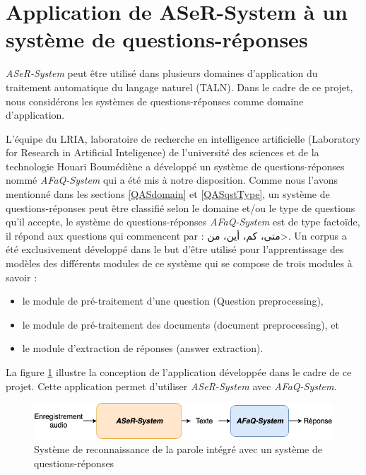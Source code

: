 


\section{Application de ASeR-System à un système de questions-réponses} \label{QASChap3}
 \textit{ASeR-System} peut être utilisé dans plusieurs domaines d'application du traitement automatique du langage naturel (TALN). Dans le cadre de ce projet, nous considérons les systèmes de questions-réponses comme domaine d'application. 

 L'équipe du LRIA, laboratoire de recherche en intelligence artificielle (Laboratory for Research in Artificial Inteligence) de l'université des sciences et de la technologie Houari Boumédiène a développé un système de questions-réponses nommé \textit{AFaQ-System} qui a été mis à notre disposition. Comme nous l'avons mentionné dans les sections \ref{QASdomain} et \ref{QASqstType}, un système de questions-réponses peut être classifié selon le domaine et/ou le type de questions qu'il accepte, le système de questions-réponses \textit{AFaQ-System} est de type factoïde, il répond aux questions qui commencent par :   \< متى، كم، أين، من>. Un corpus \cite{QASCorpus} a été exclusivement développé dans le but d'être utilisé pour l'apprentissage des modèles des différents modules de ce système qui se compose de trois modules à savoir : 
 \begin{itemize}
     \item le module de pré-traitement d'une question (Question preprocessing),
     \item le module de pré-traitement des documents (document preprocessing), et
     \item le module d'extraction de réponses (answer extraction). \\
 \end{itemize}

La figure \ref{QAS_ASR} illustre la conception de l'application développée dans le cadre de ce projet. Cette application permet d'utiliser \textit{ASeR-System} avec \textit{AFaQ-System}.
 \begin{figure}[H]
    \centering
    \includegraphics[width=400pt]{images/chap3/QASASR.png}
    \caption{Système de reconnaissance de la parole intégré avec un système de questions-réponses }
    \label{QAS_ASR}
\end{figure}

